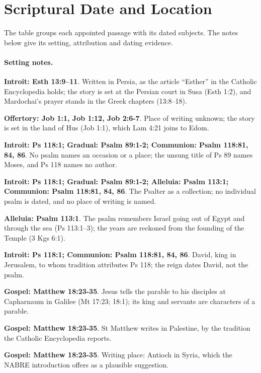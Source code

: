 \section{Scriptural Date and Location}
\label{sec:date-location}
The table groups each appointed passage with its dated subjects. The notes below give its setting, attribution and dating evidence.



\paragraph{Setting notes.}
\noindent\textbf{Introit: Esth 13:9--11}. Written in Persia, as the article ``Esther'' in the Catholic Encyclopedia holds; the story is set at the Persian court in Susa (Esth 1:2), and Mardochai's prayer stands in the Greek chapters (13:8--18).

\noindent\textbf{Offertory: Job 1:1, Job 1:12, Job 2:6-7}. Place of writing unknown; the story is set in the land of Hus (Job 1:1), which Lam 4:21 joins to Edom.

\noindent\textbf{Introit: Ps 118:1; Gradual: Psalm 89:1-2; Communion: Psalm 118:81, 84, 86}. No psalm names an occasion or a place; the unsung title of Ps 89 names Moses, and Ps 118 names no author.

\noindent\textbf{Introit: Ps 118:1; Gradual: Psalm 89:1-2; Alleluia: Psalm 113:1; Communion: Psalm 118:81, 84, 86}. The Psalter as a collection; no individual psalm is dated, and no place of writing is named.

\noindent\textbf{Alleluia: Psalm 113:1}. The psalm remembers Israel going out of Egypt and through the sea (Ps 113:1--3); the years are reckoned from the founding of the Temple (3 Kgs 6:1).

\noindent\textbf{Introit: Ps 118:1; Communion: Psalm 118:81, 84, 86}. David, king in Jerusalem, to whom tradition attributes Ps 118; the reign dates David, not the psalm.

\noindent\textbf{Gospel: Matthew 18:23-35}. Jesus tells the parable to his disciples at Capharnaum in Galilee (Mt 17:23; 18:1); its king and servants are characters of a parable.

\noindent\textbf{Gospel: Matthew 18:23-35}. St Matthew writes in Palestine, by the tradition the Catholic Encyclopedia reports.

\noindent\textbf{Gospel: Matthew 18:23-35}. Writing place: Antioch in Syria, which the NABRE introduction offers as a plausible suggestion.

